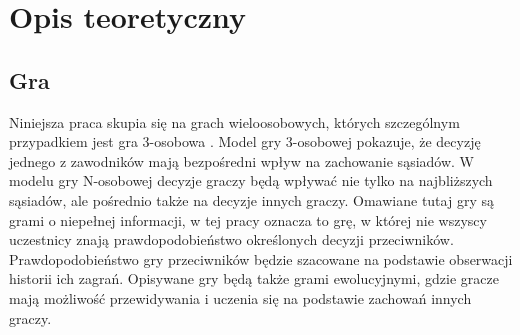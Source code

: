 \chapter{Opis teoretyczny}
\label{cha:opis_teor}

\section{Gra}
\label{sec:gra}
Niniejsza praca skupia się na grach wieloosobowych, których szczególnym przypadkiem jest gra 3-osobowa \cite{Str01}. Model gry 3-osobowej pokazuje, że decyzję jednego z zawodników mają bezpośredni wpływ na zachowanie sąsiadów. W modelu gry N-osobowej decyzje graczy będą wpływać nie tylko na najbliższych sąsiadów, ale pośrednio także na decyzje innych graczy.
Omawiane tutaj gry są grami o niepełnej informacji, w tej pracy oznacza to grę, w której nie wszyscy uczestnicy znają prawdopodobieństwo określonych decyzji przeciwników. Prawdopodobieństwo gry przeciwników będzie szacowane na podstawie obserwacji historii ich zagrań.
Opisywane gry będą także grami ewolucyjnymi, gdzie gracze mają możliwość przewidywania i uczenia się na podstawie zachowań innych graczy.


